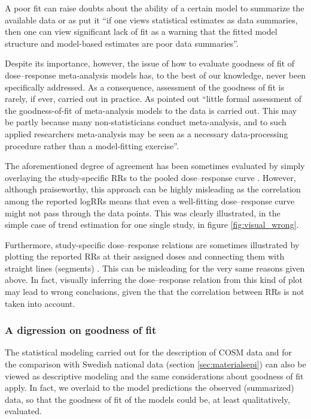 A poor fit can  raise doubts about the ability of a certain model to summarize the available data or as \citet{greenland_invited_1994} put it ``if one views statistical estimates as data summaries, then one can view significant lack of fit as a warning that the fitted model structure and model-based estimates are poor data summaries''.

Despite its importance, however, the issue of how to evaluate goodness of fit of dose--response meta-analysis models has, to the best of our knowledge, never been specifically addressed. As a consequence, assessment of the goodness of fit  is rarely, if ever, carried out in practice. As \citet{sutton_recent_2008} pointed out “little formal assessment of the goodness-of-fit of meta-analysis models to the data is carried out. This may be partly because many non-statisticians conduct meta-analysis, and to such applied researchers meta-analysis may be seen as a necessary data-processing procedure rather than a model-fitting exercise”. 

The aforementioned degree of agreement has been sometimes evaluated by simply overlaying the study-specific RRs to the pooled dose--response curve \citep[see, for example,][]{wcrf_continuous_2014, liao_blood_2015}. However, although praiseworthy, this approach can be highly misleading as the correlation among the reported logRRs means that even a well-fitting dose--response curve might not pass through the data points. This was clearly illustrated, in the simple case of trend estimation for one single study, in figure \ref{fig:visual_wrong}. 

Furthermore, study-specific dose--response relations are sometimes illustrated by plotting the reported RRs at their assigned doses and connecting them with straight lines (segments) \citep{wcrf_continuous_2014}. This can be misleading for the very same reasons given above. In fact, visually inferring the dose--response relation from this kind of plot may lead to wrong conclusions, given the that the correlation between RRs is not taken into account.  


\subsubsection{A digression on goodness of fit}

The statistical modeling carried out for the description of COSM data and for the comparison with Swedish national data (section \ref{sec:materialsepi}) can also be viewed as descriptive modeling and the same considerations about goodness of fit apply. In fact, we overlaid to the model predictions the observed (summarized) data, so that the goodness of fit of the models could be, at least qualitatively, evaluated.

